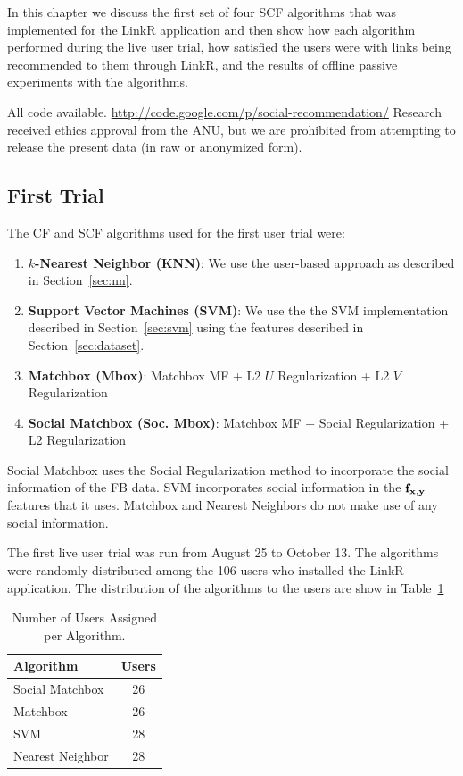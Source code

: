 In this chapter we discuss the first set of four SCF algorithms that
was implemented for the LinkR application and then show how each
algorithm performed during the live user trial, how satisfied the
users were with links being recommended to them through LinkR, and the
results of offline passive experiments with the algorithms.

All code available.
\url{http://code.google.com/p/social-recommendation/}
Research received ethics approval from the ANU, but we are prohibited
from attempting to release the present data (in raw or anonymized form).

\subsection{First Trial}

The CF and SCF algorithms used for the first user trial were:

\begin{enumerate}
\item{ {\bf $k$-Nearest Neighbor (KNN)}: We use the user-based approach as described in Section~\ref{sec:nn}.}
\item{{\bf Support Vector Machines (SVM)}: We use the the SVM implementation described in Section~\ref{sec:svm} using the features described in Section~\ref{sec:dataset}.}
\item{{\bf Matchbox (Mbox)}: Matchbox MF  + L2 $U$ Regularization + L2 $V$ Regularization}
\item{{\bf Social Matchbox (Soc. Mbox)}: Matchbox MF + Social Regularization + L2 Regularization}
\end{enumerate}

Social Matchbox uses the Social Regularization method to incorporate
the social information of the FB data. SVM incorporates social
information in the $\mathbf{f}_{\mathbf{x},\mathbf{y}}$ features that it uses. Matchbox and
Nearest Neighbors do not make use of any social information.

The first live user trial was run from August 25 to October 13. The algorithms were randomly distributed among the 106 users who installed the LinkR application. The distribution of the algorithms to the users are show in Table~\ref{tab:Assigned1}

\begin{table}[t!]
\centering
\begin{tabular}{| l | c |}
\hline
{\bf Algorithm} & {\bf Users} \\
\hline
Social Matchbox & 26\\
Matchbox  & 26 \\
SVM & 28 \\
Nearest Neighbor & 28 \\
\hline
\end{tabular}
\caption{Number of Users Assigned per Algorithm.}
\label{tab:Assigned1}
\end{table}

